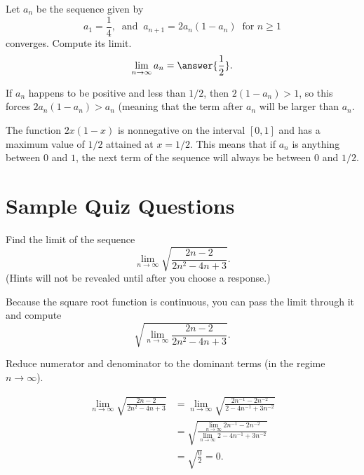 \documentclass{ximera}
\begin{document}
\begin{exercise}
Let $a_n$ be the sequence given by
\[ a_1 = \frac{1}{4}, \ \text{ and }  \ a_{n+1} = 2 a_n(1-a_n) \ \text{ for } n \geq 1 \]
converges. Compute its limit.
\[ \lim_{n \rightarrow \infty} a_n = \answer{\frac{1}{2}}. \]
\begin{hint}
If $a_n$ happens to be positive and less than $1/2$, then $2 (1-a_n) > 1$, so this forces $2 a_n(1-a_n) > a_n$ (meaning that the term after $a_n$ will be larger than $a_n$.
\begin{hint}
The function $2 x(1-x)$ is nonnegative on the interval $[0,1]$ and has a maximum value of $1/2$ attained at $x = 1/2$. This means that if $a_n$ is anything between $0$ and $1$, the next term of the sequence will always be between $0$ and $1/2$.
\end{hint}
\end{hint}
\end{exercise}

\section*{Sample Quiz Questions}

\begin{question}%

Find the limit of the sequence
\[\lim_{n \rightarrow \infty} \sqrt{\frac{2n-2}{2n^2-4n+3}}.\] 
(Hints will not be revealed until after you choose a response.)
\begin{multiplechoice}
\end{multiplechoice}
\begin{feedback}
Because the square root function is continuous, you can pass the limit through it and compute
\[ \sqrt{\lim_{n \rightarrow \infty} \frac{2n-2}{2n^2-4n+3}}. \]
\begin{hint}
Reduce numerator and denominator to the dominant terms (in the regime $n \rightarrow \infty$).
\begin{hint}
\[\begin{aligned}
\lim_{n \rightarrow \infty} \sqrt{\frac{2n-2}{2n^2-4n+3}} & = \lim_{n \rightarrow \infty} \sqrt{\frac{2n^{-1}-2n^{-2}}{2-4n^{-1}+3n^{-2}}} \\
 & = \sqrt{\frac{\lim_{n \rightarrow \infty} 2n^{-1}-2n^{-2}}{\lim_{n \rightarrow \infty} 2-4n^{-1}+3n^{-2}}} \\
 & = \sqrt{\frac{0}{2}} = 0. 
\end{aligned}\]
\end{hint}
\end{hint}
\end{feedback}

\end{question}
\end{document}
